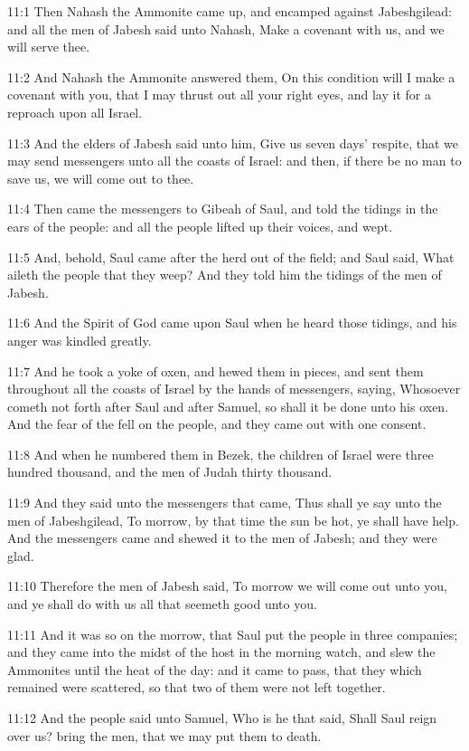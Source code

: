 11:1 Then Nahash the Ammonite came up, and encamped against Jabeshgilead: and all the men of Jabesh said unto Nahash, Make a covenant with us, and we will serve thee.

11:2 And Nahash the Ammonite answered them, On this condition will I make a covenant with you, that I may thrust out all your right eyes, and lay it for a reproach upon all Israel.

11:3 And the elders of Jabesh said unto him, Give us seven days' respite, that we may send messengers unto all the coasts of Israel: and then, if there be no man to save us, we will come out to thee.

11:4 Then came the messengers to Gibeah of Saul, and told the tidings in the ears of the people: and all the people lifted up their voices, and wept.

11:5 And, behold, Saul came after the herd out of the field; and Saul said, What aileth the people that they weep? And they told him the tidings of the men of Jabesh.

11:6 And the Spirit of God came upon Saul when he heard those tidings, and his anger was kindled greatly.

11:7 And he took a yoke of oxen, and hewed them in pieces, and sent them throughout all the coasts of Israel by the hands of messengers, saying, Whosoever cometh not forth after Saul and after Samuel, so shall it be done unto his oxen. And the fear of the \LORD fell on the people, and they came out with one consent.

11:8 And when he numbered them in Bezek, the children of Israel were three hundred thousand, and the men of Judah thirty thousand.

11:9 And they said unto the messengers that came, Thus shall ye say unto the men of Jabeshgilead, To morrow, by that time the sun be hot, ye shall have help. And the messengers came and shewed it to the men of Jabesh; and they were glad.

11:10 Therefore the men of Jabesh said, To morrow we will come out unto you, and ye shall do with us all that seemeth good unto you.

11:11 And it was so on the morrow, that Saul put the people in three companies; and they came into the midst of the host in the morning watch, and slew the Ammonites until the heat of the day: and it came to pass, that they which remained were scattered, so that two of them were not left together.

11:12 And the people said unto Samuel, Who is he that said, Shall Saul reign over us? bring the men, that we may put them to death.

